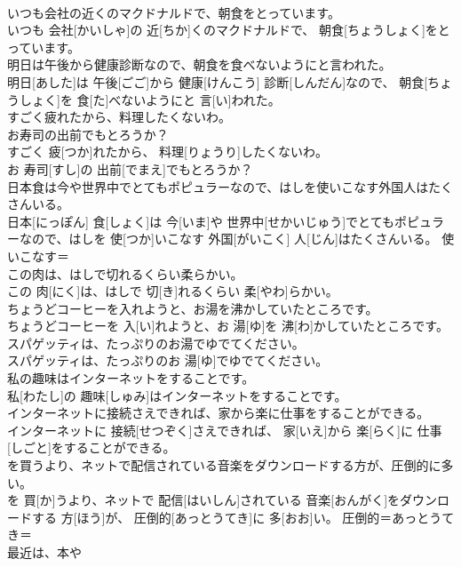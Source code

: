 \documentclass[8pt]{extreport}
\begin{document}
\begin{CJK}{UTF8}{min}
\\	いつも会社の近くのマクドナルドで、朝食をとっています。	
\\	いつも 会社[かいしゃ]の 近[ちか]くのマクドナルドで、 朝食[ちょうしょく]をとっています。	
\\	明日は午後から健康診断なので、朝食を食べないようにと言われた。	
\\	明日[あした]は 午後[ごご]から 健康[けんこう] 診断[しんだん]なので、 朝食[ちょうしょく]を 食[た]べないようにと 言[い]われた。	
\\	すごく疲れたから、料理したくないわ。 
\\	お寿司の出前でもとろうか？	
\\	すごく 疲[つか]れたから、 料理[りょうり]したくないわ。 
\\	お 寿司[すし]の 出前[でまえ]でもとろうか？	
\\	日本食は今や世界中でとてもポピュラーなので、はしを使いこなす外国人はたくさんいる。	
\\	日本[にっぽん] 食[しょく]は 今[いま]や 世界中[せかいじゅう]でとてもポピュラーなので、はしを 使[つか]いこなす 外国[がいこく] 人[じん]はたくさんいる。	使いこなす＝ 
\\	この肉は、はしで切れるくらい柔らかい。	
\\	この 肉[にく]は、はしで 切[き]れるくらい 柔[やわ]らかい。	
\\	ちょうどコーヒーを入れようと、お湯を沸かしていたところです。	
\\	ちょうどコーヒーを 入[い]れようと、お 湯[ゆ]を 沸[わ]かしていたところです。	
\\	スパゲッティは、たっぷりのお湯でゆでてください。	
\\	スパゲッティは、たっぷりのお 湯[ゆ]でゆでてください。	
\\	私の趣味はインターネットをすることです。	
\\	私[わたし]の 趣味[しゅみ]はインターネットをすることです。	
\\	インターネットに接続さえできれば、家から楽に仕事をすることができる。	
\\	インターネットに 接続[せつぞく]さえできれば、 家[いえ]から 楽[らく]に 仕事[しごと]をすることができる。	
\\	を買うより、ネットで配信されている音楽をダウンロードする方が、圧倒的に多い。	
\\	を 買[か]うより、ネットで 配信[はいしん]されている 音楽[おんがく]をダウンロードする 方[ほう]が、 圧倒的[あっとうてき]に 多[おお]い。	圧倒的＝あっとうてき＝ 
\\	最近は、本や

\end{CJK}
\end{document}
